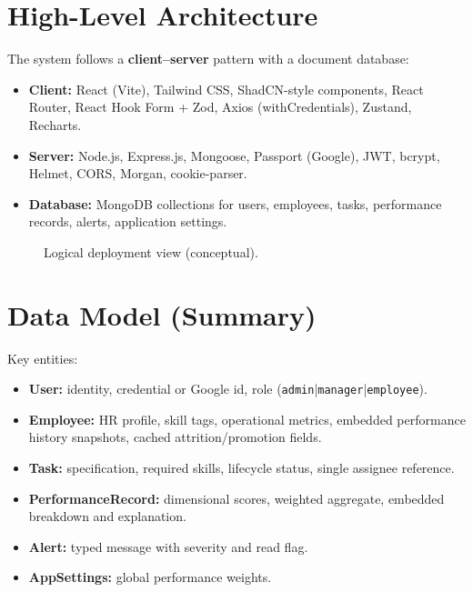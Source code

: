\section{High-Level Architecture}
The system follows a \textbf{client--server} pattern with a document database:
\begin{itemize}
  \item \textbf{Client:} React (Vite), Tailwind CSS, ShadCN-style components, React Router, React Hook Form + Zod, Axios (withCredentials), Zustand, Recharts.
  \item \textbf{Server:} Node.js, Express.js, Mongoose, Passport (Google), JWT, bcrypt, Helmet, CORS, Morgan, cookie-parser.
  \item \textbf{Database:} MongoDB collections for users, employees, tasks, performance records, alerts, application settings.
\end{itemize}

\begin{figure}[H]
  \centering
  \caption{Logical deployment view (conceptual).}
  \label{fig:arch}
\end{figure}

\section{Data Model (Summary)}
Key entities:
\begin{itemize}
  \item \textbf{User:} identity, credential or Google id, role (\texttt{admin}|\texttt{manager}|\texttt{employee}).
  \item \textbf{Employee:} HR profile, skill tags, operational metrics, embedded performance history snapshots, cached attrition/promotion fields.
  \item \textbf{Task:} specification, required skills, lifecycle status, single assignee reference.
  \item \textbf{PerformanceRecord:} dimensional scores, weighted aggregate, embedded breakdown and explanation.
  \item \textbf{Alert:} typed message with severity and read flag.
  \item \textbf{AppSettings:} global performance weights.
\end{itemize}

